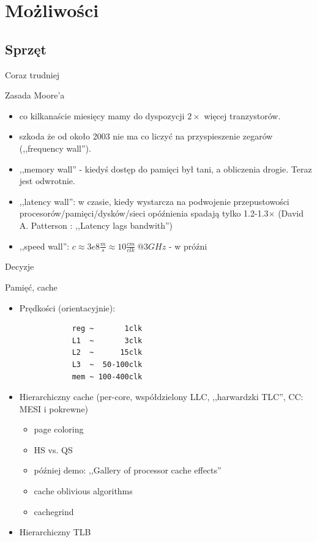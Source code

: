 \section{Możliwości} %
\subsection{Sprzęt}
\begin{frame}{Coraz trudniej}
	\begin{block}{Zasada Moore'a}
		\begin{itemize}
			\item co kilkanaście miesięcy mamy do dyspozycji $2\times$ więcej tranzystorów.
			\item szkoda że od około 2003 nie ma co liczyć na przyspieszenie zegarów (,,frequency wall'').
			\item ,,memory wall'' - kiedyś dostęp do pamięci był tani, a obliczenia drogie. Teraz jest odwrotnie.
			\item ,,latency wall'': w czasie, kiedy wystarcza na podwojenie przepustowości procesorów/pamięci/dysków/sieci opóźnienia spadają tylko 1.2-1.3$\times$ (David A. Patterson : ,,Latency lags bandwith'')
			\item ,,speed wall'': $c \approx 3e8\frac{m}{s} \approx 10 \frac{cm}{clk}~@3GHz$ - w próźni
		\end{itemize}
	\end{block}
	\begin{block}{Decyzje}
	\end{block}
\end{frame}
\begin{frame}[fragile]{Pamięć, cache}
	\begin{itemize}
		\item Prędkości (orientacyjnie):
		\begin{verbatim}
			reg ~       1clk
			L1  ~       3clk
			L2  ~      15clk
			L3  ~  50-100clk
			mem ~ 100-400clk
		\end{verbatim}
		\item Hierarchiczny cache (per-core, współdzielony LLC, ,,harwardzki TLC'', CC: MESI i pokrewne)
		\begin{itemize}
			\item page coloring
			\item HS vs. QS
			\item później demo: ,,Gallery of processor cache effects''
			\item cache oblivious algorithms
			\item cachegrind
		\end{itemize}
		\item Hierarchiczny TLB
	\end{itemize}
\end{frame}
